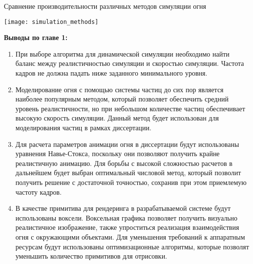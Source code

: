 \begin{table}[htb]
    \caption{Сравнение производительности различных методов симуляции огня}
    \texttt{[image: simulation\_methods]}%
    \label{table:algoAnalsysis}
\end{table}

\textbf{Выводы по главе 1:}
\begin{enumerate}
    \item При выборе алгоритма для динамической симуляции необходимо найти
        баланс между реалистичностью симуляции и скоростью симуляции. Частота
        кадров не должна падать ниже заданного минимального уровня.
    \item Моделирование огня с помощью системы частиц до сих пор является
        наиболее популярным методом, который позволяет обеспечить средний
        уровень реалистичности, но при небольшом количестве частиц обеспечивает
        высокую скорость симуляции. Данный метод будет использован для
        моделирования частиц в рамках диссертации.
    \item Для расчета параметров анимации огня в диссертации будут использованы
        уравнения Навье-Стокса, поскольку они позволяют получить крайне
        реалистичную анимацию. Для борьбы с высокой сложностью расчетов в
        дальнейшем будет выбран оптимальный числовой метод, который позволит
        получить решение с достаточной точностью, сохранив при этом приемлемую
        частоту кадров.
    \item В качестве примитива для рендеринга в разрабатываемой системе будут
        использованы воксели. Воксельная графика позволяет получить визуально
        реалистичное изображение, также упроститься реализация взаимодействия
        огня с окружающими объектами. Для уменьшения требований к аппаратным
        ресурсам будут использованы оптимизационные алгоритмы, которые позволят
        уменьшить количество примитивов для отрисовки.
\end{enumerate}
